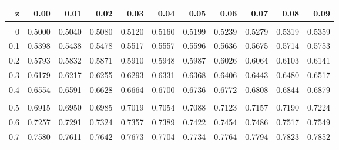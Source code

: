 \begin{center}
\begin{tabular}{r|rrrrrrrrrr}

         z &       0.00 &       0.01 &       0.02 &       0.03 &       0.04 &       0.05 &       0.06 &       0.07 &       0.08 &       0.09 \\ \hline

           &            &            &            &            &            &            &            &            &            &            \\

         0 &     0.5000 &     0.5040 &     0.5080 &     0.5120 &     0.5160 &     0.5199 &     0.5239 &     0.5279 &     0.5319 &     0.5359 \\

       0.1 &     0.5398 &     0.5438 &     0.5478 &     0.5517 &     0.5557 &     0.5596 &     0.5636 &     0.5675 &     0.5714 &     0.5753 \\

       0.2 &     0.5793 &     0.5832 &     0.5871 &     0.5910 &     0.5948 &     0.5987 &     0.6026 &     0.6064 &     0.6103 &     0.6141 \\

       0.3 &     0.6179 &     0.6217 &     0.6255 &     0.6293 &     0.6331 &     0.6368 &     0.6406 &     0.6443 &     0.6480 &     0.6517 \\

       0.4 &     0.6554 &     0.6591 &     0.6628 &     0.6664 &     0.6700 &     0.6736 &     0.6772 &     0.6808 &     0.6844 &     0.6879 \\

           &            &            &            &            &            &            &            &            &            &            \\

       0.5 &     0.6915 &     0.6950 &     0.6985 &     0.7019 &     0.7054 &     0.7088 &     0.7123 &     0.7157 &     0.7190 &     0.7224 \\

       0.6 &     0.7257 &     0.7291 &     0.7324 &     0.7357 &     0.7389 &     0.7422 &     0.7454 &     0.7486 &     0.7517 &     0.7549 \\

       0.7 &     0.7580 &     0.7611 &     0.7642 &     0.7673 &     0.7704 &     0.7734 &     0.7764 &     0.7794 &     0.7823 &     0.7852 \\


\end{tabular}
\end{center}
